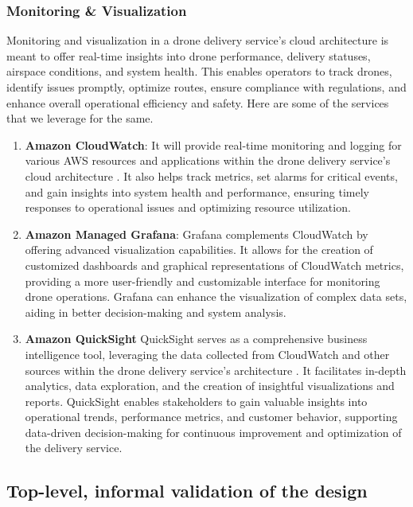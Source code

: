 \documentclass{article}
\begin{document}
\subsubsection{Monitoring \& Visualization}
Monitoring and visualization in a drone delivery service's cloud architecture is meant to offer real-time insights into drone performance, delivery statuses, airspace conditions, and system health. This enables operators to track drones, identify issues promptly, optimize routes, ensure compliance with regulations, and enhance overall operational efficiency and safety. Here are some of the services that we leverage for the same.
\begin{enumerate}
    \item \textbf{Amazon CloudWatch}: It will provide real-time monitoring and logging for various AWS resources and applications within the drone delivery service's cloud architecture \cite{cloudwatch}. It also helps track metrics, set alarms for critical events, and gain insights into system health and performance, ensuring timely responses to operational issues and optimizing resource utilization.
    \item \textbf{Amazon Managed Grafana}: Grafana complements CloudWatch by offering advanced visualization capabilities. It allows for the creation of customized dashboards and graphical representations of CloudWatch metrics, providing a more user-friendly and customizable interface for monitoring drone operations. Grafana can enhance the visualization of complex data sets, aiding in better decision-making and system analysis.
    \item \textbf{Amazon QuickSight} QuickSight serves as a comprehensive business intelligence tool, leveraging the data collected from CloudWatch and other sources within the drone delivery service's architecture \cite{quicksight}. It facilitates in-depth analytics, data exploration, and the creation of insightful visualizations and reports. QuickSight enables stakeholders to gain valuable insights into operational trends, performance metrics, and customer behavior, supporting data-driven decision-making for continuous improvement and optimization of the delivery service.

\end{enumerate}


\subsection{Top-level, informal validation of the design}\label{4_2}
\end{document}
